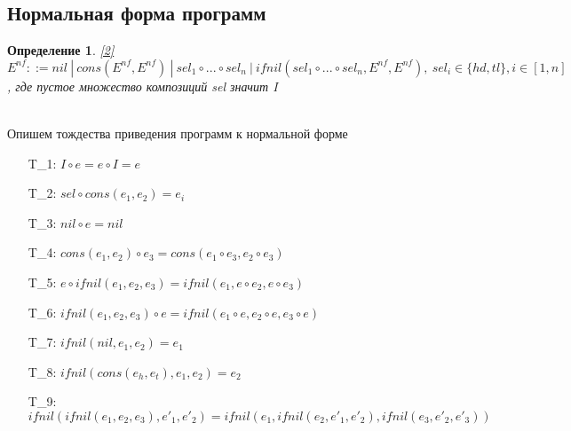 \documentclass[12pt]{article}
\newtheorem{defn}{Определение}[section]
\begin{document}
\subsection{Нормальная форма программ}
\begin{defn} \hyperlink{bibl2}{[2]} $E^{nf} ::= nil\ |\ cons(E^{nf}, E^{nf})\ |\ sel_{1} \circ ... \circ sel_{n}\ |\ ifnil(sel_{1} \circ ... \circ sel_{n}, E^{nf}, E^{nf}), \ sel_{i} \in \{hd, tl\}, i \in [1,n]$, где пустое множество композиций sel значит I \end{defn}\\
Опишем тождества приведения программ к нормальной форме\\
\begin{enumerate}
	\item[T_{1}:] $I \circ e = e \circ I = e$
	\item[T_{2}:] $sel \circ cons(e_{1}, e_{2}) = e_{i}$
	\item[T_{3}:] $nil \circ e = nil$
	\item[T_{4}:] $cons(e_{1}, e_{2}) \circ e_{3} = cons(e_{1} \circ e_{3}, e_{2} \circ e_{3})$
	\item[T_{5}:] $e \circ ifnil(e_{1}, e_{2}, e_{3}) = ifnil(e_{1}, e \circ e_{2}, e \circ e_{3})$
	\item[T_{6}:] $ifnil(e_{1}, e_{2}, e_{3}) \circ e = ifnil(e_{1} \circ e, e_{2} \circ e, e_{3} \circ e)$
	\item[T_{7}:] $ifnil(nil, e_{1}, e_{2}) = e_{1}$
	\item[T_{8}:] $ifnil(cons(e_{h}, e_{t}), e_{1}, e_{2}) = e_{2}$
	\item[T_{9}:] $ifnil(ifnil(e_{1}, e_{2}, e_{3}), e'_{1}, e'_{2}) = ifnil(e_{1}, ifnil(e_{2}, e'_{1}, e'_{2}), ifnil(e_{3}, e'_{2}, e'_{3}))$
\end{enumerate}\\
\end{document}
